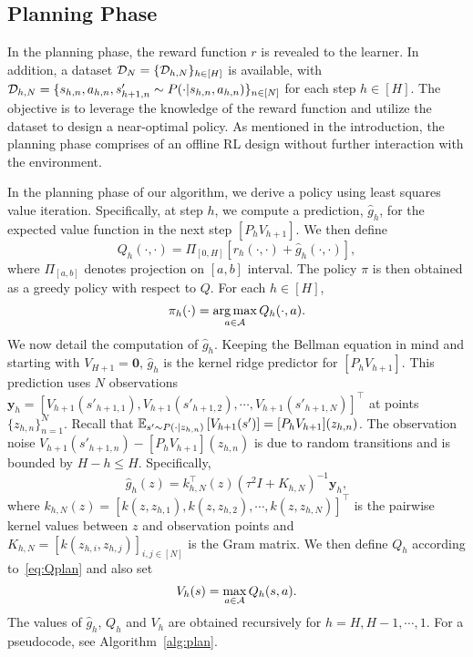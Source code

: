 \subsection{Planning Phase} In the planning phase, the reward function $r$ is revealed to the learner. In addition, a dataset $\mathcal{D}_N=\{\mathcal{D}_{h,N}\}_{h\in[H]}$ is available, with $\mathcal{D}_{h,N}=\{s_{h,n}, a_{h,n}, s'_{h+1,n}\sim P(\cdot|s_{h,n}, a_{h,n})\}_{ n\in[N]}$ for each step $h\in[H]$. The objective is to leverage the knowledge of the reward function and utilize the dataset to design a near-optimal policy.
As mentioned in the introduction, the planning phase comprises of an offline RL design without further interaction with the environment.  


In the planning phase of our algorithm, we derive a policy using least squares value iteration. Specifically, at step $h$, we compute a prediction, $\hat{g}_{h}$, for the expected value function in the next step $[P_hV_{h+1}]$. We then define
\begin{equation}\label{eq:Qplan}
    Q_h(\cdot, \cdot) = \Pi_{[0,H]}\left[r_h(\cdot, \cdot)+ \hat{g}_h(\cdot, \cdot)\right],
\end{equation}
where $\Pi_{[a,b]}$ denotes projection on $[a,b]$ interval. 
The policy $\pi$ is then obtained as a greedy policy with respect to $Q$. For each $h\in[H]$,
\begin{equation*}
    \pi_h(\cdot) = \operatorname*{arg\,max}_{a\in\mathcal{A}}Q_h(\cdot, a).
\end{equation*}
We now detail the computation of $\hat{g}_h$. Keeping the Bellman equation in mind and starting with $V_{H+1}=\bm{0}$, $\hat{g}_h$ is the kernel ridge predictor for $[P_hV_{h+1}]$. This prediction uses $N$ observations $\bm{y}_{h}=[V_{h+1}(s'_{h+1, 1}),V_{h+1}(s'_{h+1, 2}), \cdots,V_{h+1}(s'_{h+1, N}) ]^{\top}$ at points $\{z_{h,n}\}_{n=1}^N$. 
Recall that 
$
\mathbb{E}_{s'\sim P(\cdot|z_{h, n})}\left[V
_{h+1}(s')  \right]  = [P_hV_{h+1}](z_{h,n})
$.
The observation noise $V_{h+1}(s'_{h+1,n})-[P_hV_{h+1}](z_{h,n})$ is due to random transitions and is bounded by $H-h\le H$. Specifically, 
\begin{equation}\label{eq:ghn}
    \hat{g}_h(z) = k^{\top}_{h,N}(z)(\tau^2 I + K_{h,N})^{-1} \bm{y}_{h},
\end{equation}
where $k_{h,N}(z)=[k(z,z_{h,1}), k(z,z_{h,2}), \cdots, k(z,z_{h,N})]^{\top}$ is the pairwise kernel values between $z$ and observation points and $K_{h,N}=[k(z_{h,i}, z_{h,j})]_{i,j\in[N]}$ is the Gram matrix.
We then define $Q_h$ according to~\eqref{eq:Qplan} and also set
\begin{equation*}
    V_h(s)=\max_{a\in\mathcal{A}} Q_h(s, a).
\end{equation*}
The values of $\hat{g}_h$, $Q_h$ and $V_h$ are obtained recursively for $h=H,H-1, \cdots, 1$.
For a pseudocode, see Algorithm~\ref{alg:plan}.


